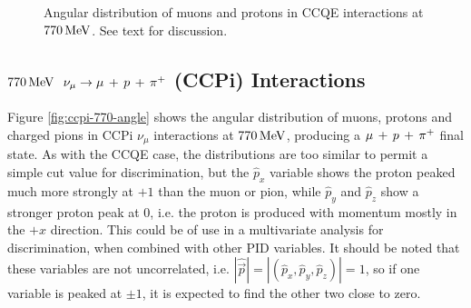\begin{figure}
{        \label{fig:ccqe-pz-770}
    }
    \caption[Angular distribution of $\mu$, $p$ at $770\MeV$]{\label{fig:ccqe-770-angle}Angular distribution of muons and protons in \acs{CCQE} interactions at $770\MeV$. See text for discussion.}
\end{figure}

\subsection{$770\MeV$ \texorpdfstring{$\nu_\mu \rightarrow \mu\,+\,p\,+\,\pi^{+}$}{ν\_μ → μ + p + π⁺} (\texorpdfstring{\acs{CCPi}}{CC1π}) Interactions}
Figure \ref{fig:ccpi-770-angle} shows the angular distribution of muons, protons and charged pions in \acs{CCPi} $\nu_\mu$ interactions at $770\MeV$, producing a $\mu\,+\,p\,+\,\pi^{+}$ final state. As with the \acs{CCQE} case, the distributions are too similar to permit a simple cut value for discrimination, but the $\hat{p}_x$ variable shows the proton peaked much more strongly at $+1$ than the muon or pion, while $\hat{p}_y$ and $\hat{p}_z$ show a stronger proton peak at $0$, i.e. the proton is produced with momentum mostly in the $+x$ direction. This could be of use in a multivariate analysis for discrimination, when combined with other PID variables. It should be noted that these variables are not uncorrelated, i.e. $\left|\hat{\vec{p}}\right| = \left|(\hat{p}_x, \hat{p}_y, \hat{p}_z)\right| = 1$, so if one variable is peaked at $\pm 1$, it is expected to find the other two close to zero.


